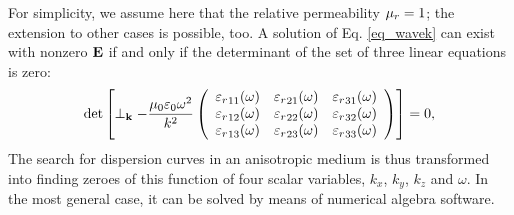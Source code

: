 For simplicity, we assume here that the relative permeability $\mu_r = 1$; the extension to other cases is possible, too. %
A solution of Eq. \ref{eq_wavek} can exist with nonzero $\mathbf{E}$ if and only if the determinant of the set of three linear equations is zero:
\begin{equation} 
\det\left[
\perp_{\mathbf{k}} -
	\frac{\mu_0 \varepsilon_0 \omega^2}{k^2}
	\left(\begin{array}{ccc} 
	{\varepsilon_r}_{11}(\omega) & {\varepsilon_r}_{21}(\omega) & {\varepsilon_r}_{31}(\omega)  \\
	{\varepsilon_r}_{12}(\omega) & {\varepsilon_r}_{22}(\omega) & {\varepsilon_r}_{32}(\omega)  \\
	{\varepsilon_r}_{13}(\omega) & {\varepsilon_r}_{23}(\omega) & {\varepsilon_r}_{33}(\omega)  
	\end{array} \right) \right] = 0, \label{eq_dispdet}\end{equation}
The search for dispersion curves in an anisotropic medium is thus transformed into finding zeroes of this function of four scalar variables, $k_x$, $k_y$, $k_z$ and $\omega$.
In the most general case, it can be solved by means of numerical algebra software. 

